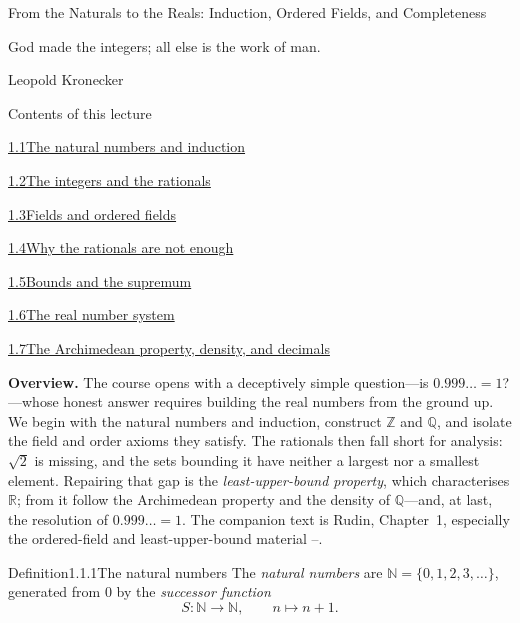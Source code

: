 \documentclass[main.tex]{subfiles}
\begin{document}
%
  {From the Naturals to the Reals: Induction, Ordered Fields, and Completeness}

\epigraph{God made the integers; all else is the work of man.}{Leopold Kronecker}

\begin{lecturecontents}{Contents of this lecture}
  \item \hyperlink{1.1}{1.1\quad The natural numbers and induction}
  \item \hyperlink{1.2}{1.2\quad The integers and the rationals}
  \item \hyperlink{1.3}{1.3\quad Fields and ordered fields}
  \item \hyperlink{1.4}{1.4\quad Why the rationals are not enough}
  \item \hyperlink{1.5}{1.5\quad Bounds and the supremum}
  \item \hyperlink{1.6}{1.6\quad The real number system}
  \item \hyperlink{1.7}{1.7\quad The Archimedean property, density, and decimals}
\end{lecturecontents}

\bigskip
\noindent\textbf{Overview.} The course opens with a deceptively simple question---is
$0.999\ldots=1$?---whose honest answer requires building the real numbers from the ground up. We
begin with the natural numbers and induction, construct $\mathbb Z$ and $\mathbb Q$, and isolate
the field and order axioms they satisfy. The rationals then fall short for analysis: $\sqrt2$ is
missing, and the sets bounding it have neither a largest nor a smallest element. Repairing that
gap is the \emph{least-upper-bound property}, which characterises $\mathbb R$; from it follow the
Archimedean property and the density of $\mathbb Q$---and, at last, the resolution of
$0.999\ldots=1$. The companion text is Rudin, Chapter~1, especially the ordered-field and
least-upper-bound material --.

\clearpage

\begin{Obj}{Definition}{1.1.1}{The natural numbers}
The \emph{natural numbers} are $\mathbb N=\{0,1,2,3,\dots\}$, generated from $0$ by the
\emph{successor function}
\[ S:\mathbb N\to\mathbb N,\qquad n\mapsto n+1 . \]
\end{Obj}
\end{document}
